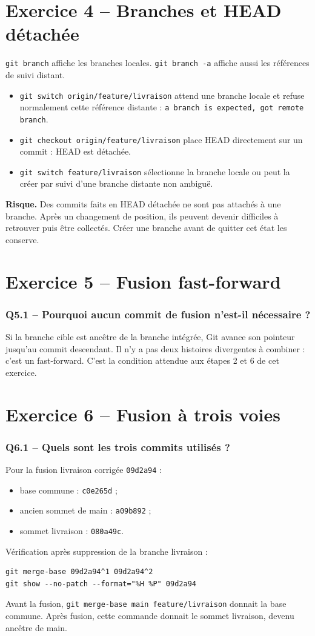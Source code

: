 \documentclass[10pt,a4paper]{article}
\newcommand{\question}[1]{\subsubsection*{#1}}
\begin{document}
\newpage
\section*{Exercice 4 -- Branches et HEAD détachée}
\texttt{git branch} affiche les branches locales. \texttt{git branch -a} affiche aussi les références de suivi distant.

\begin{itemize}
\item \texttt{git switch origin/feature/livraison} attend une branche locale et refuse normalement cette référence distante : \texttt{a branch is expected, got remote branch}.
\item \texttt{git checkout origin/feature/livraison} place HEAD directement sur un commit : HEAD est détachée.
\item \texttt{git switch feature/livraison} sélectionne la branche locale ou peut la créer par suivi d'une branche distante non ambiguë.
\end{itemize}

\textbf{Risque.} Des commits faits en HEAD détachée ne sont pas attachés à une branche. Après un changement de position, ils peuvent devenir difficiles à retrouver puis être collectés. Créer une branche avant de quitter cet état les conserve.

\section*{Exercice 5 -- Fusion fast-forward}
\question{Q5.1 -- Pourquoi aucun commit de fusion n'est-il nécessaire ?}
Si la branche cible est ancêtre de la branche intégrée, Git avance son pointeur jusqu'au commit descendant. Il n'y a pas deux histoires divergentes à combiner : c'est un fast-forward. C'est la condition attendue aux étapes 2 et 6 de cet exercice.

\section*{Exercice 6 -- Fusion à trois voies}
\question{Q6.1 -- Quels sont les trois commits utilisés ?}
Pour la fusion livraison corrigée \texttt{09d2a94} :
\begin{itemize}
\item base commune : \texttt{c0e265d} ;
\item ancien sommet de main : \texttt{a09b892} ;
\item sommet livraison : \texttt{080a49c}.
\end{itemize}
Vérification après suppression de la branche livraison :
\begin{tcolorbox}[colback=Light,colframe=Border,boxrule=.4pt,arc=0pt,left=3mm,right=3mm,top=2mm,bottom=2mm]
\begin{Verbatim}[fontsize=\small]
git merge-base 09d2a94^1 09d2a94^2
git show --no-patch --format="%H %P" 09d2a94
\end{Verbatim}
\end{tcolorbox}
Avant la fusion, \texttt{git merge-base main feature/livraison} donnait la base commune. Après fusion, cette commande donnait le sommet livraison, devenu ancêtre de main.
\end{document}
